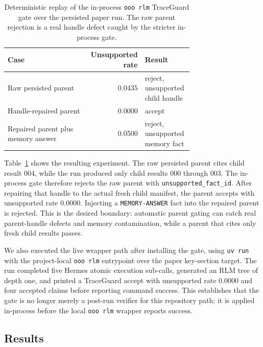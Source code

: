 \documentclass[11pt,a4paper]{article}
\begin{document}
\begin{table}[t]
\centering
\caption{Deterministic replay of the in-process \texttt{ooo rlm} TraceGuard
gate over the persisted paper run. The raw parent rejection is a real handle
defect caught by the stricter in-process gate.}
\label{tab:ooo-rlm-inprocess-gate}
\small
\begin{tabular}{p{0.46\linewidth}rp{0.26\linewidth}}
\toprule
Case & Unsupported rate & Result \\
\midrule
Raw persisted parent & 0.0435 & reject, unsupported child handle \\
Handle-repaired parent & 0.0000 & accept \\
Repaired parent plus memory answer & 0.0500 & reject, unsupported memory fact \\
\bottomrule
\end{tabular}
\end{table}

Table~\ref{tab:ooo-rlm-inprocess-gate} shows the resulting experiment. The
raw persisted parent cites child result 004, while the run produced only child
results 000 through 003. The in-process gate therefore rejects the raw parent
with \texttt{unsupported\_fact\_id}. After
repairing that handle to the actual fresh child manifest, the parent accepts
with unsupported rate 0.0000. Injecting a \texttt{MEMORY-ANSWER} fact into the
repaired parent is rejected. This is the desired boundary: automatic parent
gating can catch real parent-handle defects and memory contamination, while a
parent that cites only fresh child results passes.

We also executed the live wrapper path after installing the gate, using
\texttt{uv run} with the project-local \texttt{ooo rlm} entrypoint over the
paper key-section target. The run completed five Hermes atomic execution
sub-calls, generated an RLM tree of depth one, and printed a TraceGuard accept
with unsupported rate 0.0000 and four accepted claims before reporting command
success. This establishes that the gate is no longer merely a post-run
verifier for this repository path; it is applied in-process before the local
\texttt{ooo rlm} wrapper reports success.

\subsection{Results}
\label{sec:results}
\end{document}
